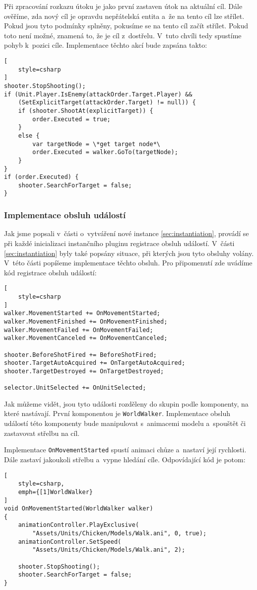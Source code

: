 Při zpracování rozkazu útoku je jako první zastaven útok na aktuální cíl. Dále ověříme, zda nový cíl je opravdu nepřátelská entita a~že na tento cíl lze střílet. Pokud jsou tyto podmínky splněny, pokusíme se na tento cíl začít střílet. Pokud toto není možné, znamená to, že je cíl z~dostřelu. V~tuto chvíli tedy spustíme pohyb k~pozici cíle. Implementace těchto akcí bude zapsána takto:
\begin{lstlisting}[
	style=csharp
]
shooter.StopShooting();
if (Unit.Player.IsEnemy(attackOrder.Target.Player) && 
	(SetExplicitTarget(attackOrder.Target) != null)) {
	if (shooter.ShootAt(explicitTarget)) {
		order.Executed = true;
	}
	else {
		var targetNode = \*get target node*\ 
		order.Executed = walker.GoTo(targetNode);
	} 
}
if (order.Executed) {
	shooter.SearchForTarget = false;
}
\end{lstlisting}

\subsubsection{Implementace obsluh událostí}
\label{sec:eventhandlers}

Jak jsme popsali v~části o~vytváření nové instance \ref{sec:instantiation}, provádí se při každé inicializaci instančního pluginu registrace obsluh událostí. V~části \ref{sec:instantiation} byly také popsány situace, při kterých jsou tyto obsluhy volány. V~této části popíšeme implementace těchto obsluh. Pro připomenutí zde uvádíme kód registrace obsluh událostí:
\begin{lstlisting}[
	style=csharp
]
walker.MovementStarted += OnMovementStarted;
walker.MovementFinished += OnMovementFinished;
walker.MovementFailed += OnMovementFailed;
walker.MovementCanceled += OnMovementCanceled;

shooter.BeforeShotFired += BeforeShotFired;
shooter.TargetAutoAcquired += OnTargetAutoAcquired;
shooter.TargetDestroyed += OnTargetDestroyed;

selector.UnitSelected += OnUnitSelected;
\end{lstlisting}

Jak můžeme vidět, jsou tyto události rozděleny do skupin podle komponenty, na které nastávají. První komponentou je \texttt{WorldWalker}. Implementace obsluh událostí této komponenty bude manipulovat s~animacemi modelu a~spouštět či zastavovat střelbu na cíl.

Implementace \texttt{OnMovementStarted} spustí animaci chůze a~nastaví její rychlosti. Dále zastaví jakoukoli střelbu a~vypne hledání cíle. Odpovídající kód je potom:
\begin{lstlisting}[
	style=csharp,
	emph={[1]WorldWalker}
]
void OnMovementStarted(WorldWalker walker)
{
	animationController.PlayExclusive(
		"Assets/Units/Chicken/Models/Walk.ani", 0, true);
	animationController.SetSpeed(
		"Assets/Units/Chicken/Models/Walk.ani", 2);

	shooter.StopShooting();
	shooter.SearchForTarget = false;
}
\end{lstlisting}

